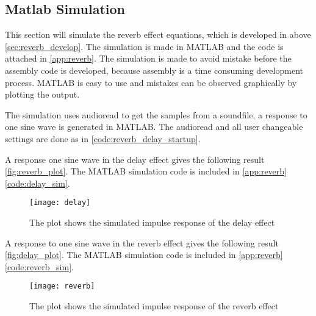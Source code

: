\subsection{Matlab Simulation}
This section will simulate the \gls{reverb} effect equations, which is developed in above \autoref{sec:reverb_develop}. The simulation is made in MATLAB and the code is attached in \autoref{app:reverb}. The simulation is made to avoid mistake before the assembly code is developed, because assembly is a time consuming development process. MATLAB is easy to use and mistakes can be observed graphically by plotting the output.

The simulation uses audioread to get the samples from a soundfile, a response to one sine wave is generated in MATLAB. The audioread and all user changeable settings are done as in \autoref{code:reverb_delay_startup}.
 


A response one sine wave in the delay effect gives the following result \autoref{fig:reverb_plot}. The MATLAB simulation code is included in \autoref{app:reverb} \autoref{code:delay_sim}.

\begin{figure}[htbp]
	\centering
	\texttt{[image: delay]}
	\caption{The plot shows the simulated impulse response of the delay effect}
	\label{fig:delay_plot}
\end{figure}



A response to one sine wave in the \gls{reverb}  effect gives the following result \autoref{fig:delay_plot}. The MATLAB simulation code is included in \autoref{app:reverb} \autoref{code:reverb_sim}.
\begin{figure}[htbp]
	\centering
	\texttt{[image: reverb]}
	\caption{The plot shows the simulated impulse response of the \gls{reverb} effect}
	\label{fig:reverb_plot}
\end{figure}

\newpage
